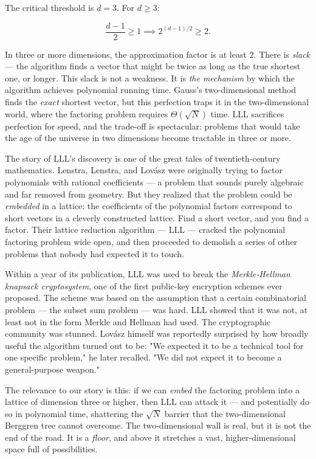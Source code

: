 The critical threshold is $d = 3$. For $d \ge 3$:

\[
\frac{d-1}{2} \ge 1 \implies 2^{(d-1)/2} \ge 2.\]

In three or more dimensions, the approximation factor is at least $2$. There is \textit{slack} --- the algorithm finds a vector that might be twice as long as the true shortest one, or longer. This slack is not a weakness. It is \textit{the mechanism} by which the algorithm achieves polynomial running time. Gauss's two-dimensional method finds the \textit{exact} shortest vector, but this perfection traps it in the two-dimensional world, where the factoring problem requires $\Theta(\sqrt{N})$ time. LLL sacrifices perfection for speed, and the trade-off is spectacular: problems that would take the age of the universe in two dimensions become tractable in three or more.


The story of LLL's discovery is one of the great tales of twentieth-century mathematics. Lenstra, Lenstra, and Lovász were originally trying to factor polynomials with rational coefficients --- a problem that sounds purely algebraic and far removed from geometry. But they realized that the problem could be \textit{embedded} in a lattice: the coefficients of the polynomial factors correspond to short vectors in a cleverly constructed lattice. Find a short vector, and you find a factor. Their lattice reduction algorithm --- LLL --- cracked the polynomial factoring problem wide open, and then proceeded to demolish a series of other problems that nobody had expected it to touch.

Within a year of its publication, LLL was used to break the \textit{Merkle-Hellman knapsack cryptosystem}, one of the first public-key encryption schemes ever proposed. The scheme was based on the assumption that a certain combinatorial problem --- the subset sum problem --- was hard. LLL showed that it was not, at least not in the form Merkle and Hellman had used. The cryptographic community was stunned. Lovász himself was reportedly surprised by how broadly useful the algorithm turned out to be: "We expected it to be a technical tool for one specific problem," he later recalled. "We did not expect it to become a general-purpose weapon."

The relevance to our story is this: if we can \textit{embed} the factoring problem into a lattice of dimension three or higher, then LLL can attack it --- and potentially do so in polynomial time, shattering the $\sqrt{N}$ barrier that the two-dimensional Berggren tree cannot overcome. The two-dimensional wall is real, but it is not the end of the road. It is a \textit{floor}, and above it stretches a vast, higher-dimensional space full of possibilities.


